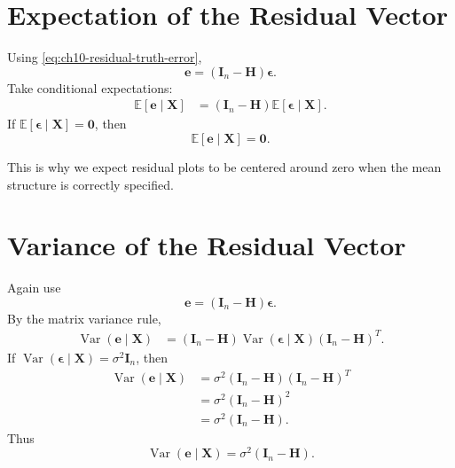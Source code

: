 \section{Expectation of the Residual Vector}

Using \eqref{eq:ch10-residual-truth-error},
\begin{equation}
  \mathbf{e}=(\mathbf{I}_n-\mathbf{H})\boldsymbol{\epsilon}.
\end{equation}
Take conditional expectations:
\begin{align}
  \mathbb{E}[\mathbf{e}\mid\mathbf{X}]
  &=(\mathbf{I}_n-\mathbf{H})\mathbb{E}[\boldsymbol{\epsilon}\mid\mathbf{X}].
\end{align}
If \(\mathbb{E}[\boldsymbol{\epsilon}\mid\mathbf{X}]=\mathbf{0}\), then
\begin{equation}
  \boxed{
  \mathbb{E}[\mathbf{e}\mid\mathbf{X}]=\mathbf{0}.
  }
\end{equation}

This is why we expect residual plots to be centered around zero when the mean structure is correctly specified.

\section{Variance of the Residual Vector}

Again use
\begin{equation}
  \mathbf{e}=(\mathbf{I}_n-\mathbf{H})\boldsymbol{\epsilon}.
\end{equation}
By the matrix variance rule,
\begin{align}
  \operatorname{Var}(\mathbf{e}\mid\mathbf{X})
  &=(\mathbf{I}_n-\mathbf{H})
  \operatorname{Var}(\boldsymbol{\epsilon}\mid\mathbf{X})
  (\mathbf{I}_n-\mathbf{H})^T.
\end{align}
If \(\operatorname{Var}(\boldsymbol{\epsilon}\mid\mathbf{X})=\sigma^2\mathbf{I}_n\), then
\begin{align}
  \operatorname{Var}(\mathbf{e}\mid\mathbf{X})
  &=\sigma^2(\mathbf{I}_n-\mathbf{H})(\mathbf{I}_n-\mathbf{H})^T \\
  &=\sigma^2(\mathbf{I}_n-\mathbf{H})^2 \\
  &=\sigma^2(\mathbf{I}_n-\mathbf{H}).
\end{align}
Thus
\begin{equation}
  \boxed{
  \operatorname{Var}(\mathbf{e}\mid\mathbf{X})
  =\sigma^2(\mathbf{I}_n-\mathbf{H}).
  }
  \label{eq:ch10-var-residual}
\end{equation}

